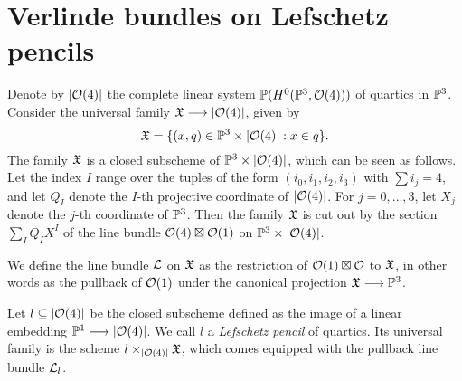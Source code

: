 \section{Verlinde bundles on Lefschetz pencils}


\newcommand{\schemeofquartics}{|\mc{O}(4)|}

Denote by $\schemeofquartics$ the complete linear system $\mathbb{P}(H^0(\mathbb{P}^3, \mathcal{O}(4)))$ of quartics in $\mathbb{P}^3$. Consider the universal family $\mf{X} \to \schemeofquartics$, given by 
\[
	\mf{X} = \{(x, q) \in \PP^3 \times \schemeofquartics : x \in q\}.
\]
The family $\mathfrak{X}$ is a closed subscheme of $\PP^3 \times \schemeofquartics$, which can be seen as follows. Let the index $I$ range over the tuples of the form $(i_0,i_1,i_2,i_3)$ with $\sum i_j = 4$, and let $Q_I$ denote the $I$-th projective coordinate of $\schemeofquartics$. For $j=0,\dotsc,3$, let $X_j$ denote the $j$-th coordinate of $\mathbb{P}^3$. Then the family $\mathfrak{X}$ is cut out by the section $\sum_{I} Q_{I} X^{I}$ of the line bundle $\mathcal{O}(4) \boxtimes \mathcal{O}(1)$ on $\PP^3 \times \schemeofquartics$.

We define the line bundle $\mathcal{L}$ on $\mathfrak{X}$ as the restriction of $\mathcal{O}(1)\boxtimes\mathcal{O}$ to $\mathfrak{X}$, in other words as the pullback of $\mathcal{O}(1)$ under the canonical projection $\mathfrak{X} \longrightarrow \mathbb{P}^3$.

Let $l \subseteq \schemeofquartics$ be the closed subscheme defined as the image of a linear embedding $\PP^1\to \schemeofquartics$. We call $l$ a \emph{Lefschetz pencil} of quartics.	Its universal family is the scheme $l \times_{\schemeofquartics} \mf{X}$, which comes equipped with the pullback line bundle $\mathcal{L}_l$.

